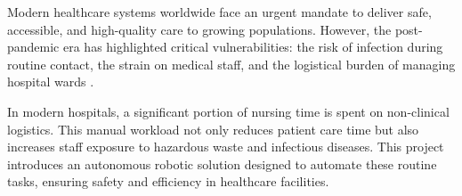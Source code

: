 Modern healthcare systems worldwide face an urgent mandate to deliver safe, accessible, and high-quality care to growing populations. However, the post-pandemic era has highlighted critical vulnerabilities: the risk of infection during routine contact, the strain on medical staff, and the logistical burden of managing hospital wards \cite{frontiers2024}.

In modern hospitals, a significant portion of nursing time is spent on non-clinical logistics. This manual workload not only reduces patient care time but also increases staff exposure to hazardous waste and infectious diseases. This project introduces an autonomous robotic solution designed to automate these routine tasks, ensuring safety and efficiency in healthcare facilities.
